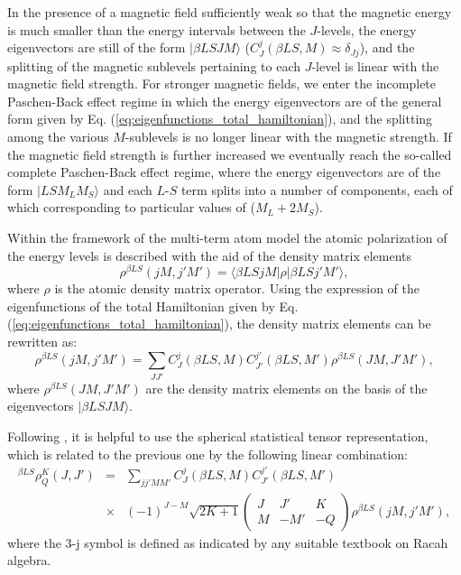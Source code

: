 \documentclass[12pt]{article}
\newcommand{\threej}[6]
{ \left(\begin{array}{ccc}
#1&#2&#3\\
#4&#5&#6
\end{array}\right) }
\begin{document}
In the presence of a magnetic field sufficiently weak so that the magnetic
energy is much smaller than the energy intervals between the $J$-levels, the energy eigenvectors are still
of the form $|\beta L S J M\rangle$ ($C_J^j(\beta L S, M) \approx \delta_{Jj}$), and the
splitting of the magnetic sublevels pertaining to each $J$-level is linear with the magnetic field strength. 
For stronger magnetic fields, we enter the incomplete Paschen-Back effect regime in which the energy eigenvectors are
of the general form given by Eq. (\ref{eq:eigenfunctions_total_hamiltonian}),
and the splitting among the various $M$-sublevels is no longer linear with the
magnetic strength. If the magnetic field strength is further increased we
eventually reach the so-called complete Paschen-Back effect regime, where the
energy eigenvectors are of the form $|L S M_L M_S\rangle$ and each $L$-$S$ term
splits into a number of components, each of which corresponding to particular
values of ($M_L+2M_S$).

Within the framework of the multi-term atom model the atomic polarization of the
energy levels is described with the
aid of the density matrix elements
\begin{equation}
\rho^{\beta L S}(jM,j'M') = \langle \beta L S j M | \rho | \beta L S j' M'\rangle,
\end{equation}
where $\rho$ is the atomic density matrix operator. Using the expression of the
eigenfunctions of the
total Hamiltonian given by Eq. (\ref{eq:eigenfunctions_total_hamiltonian}), the
density matrix 
elements can be rewritten as:
\begin{equation}
\rho^{\beta L S}(jM,j'M') = \sum_{JJ'} C_J^j(\beta L S, M) C_{J'}^{j'}(\beta L
S, M') \rho^{\beta L S}(JM,J'M'),
\end{equation}
where $\rho^{\beta L S}(JM,J'M')$ are the density matrix elements on the basis of
the eigenvectors $| \beta L S J M\rangle$.

Following \cite{landi_landolfi04}, it is helpful to use the spherical
statistical tensor 
representation, which is related to the previous one by the following linear
combination:
\begin{eqnarray}
{^{\beta LS}\rho^K_Q(J,J')} &=& \sum_{jj'MM'} C_J^j(\beta L S, M)
C_{J'}^{j'}(\beta L S, M') \nonumber \\
&\times& (-1)^{J-M} \sqrt{2K+1} \threej{J}{J'}{K}{M}{-M'}{-Q} 
\rho^{\beta L S}(jM,j'M'),
\end{eqnarray}
where the 3-j symbol is defined as indicated by any
suitable textbook on Racah algebra.
\end{document}
